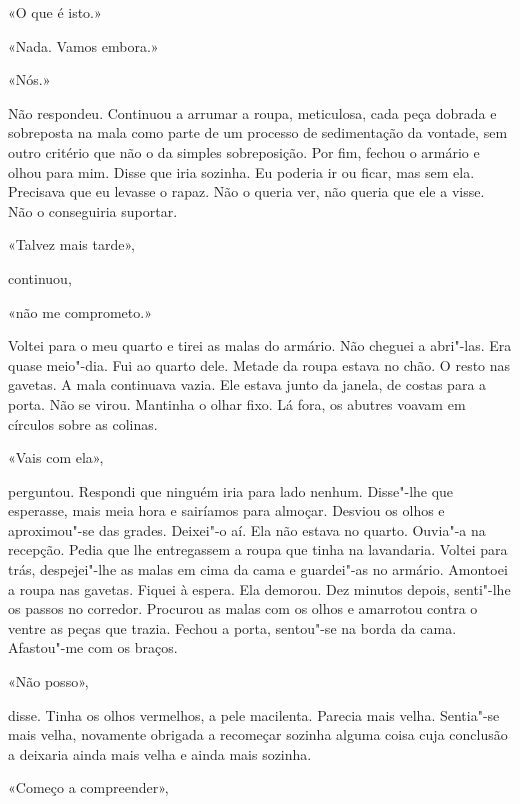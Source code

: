 «O que é isto.»

«Nada. Vamos embora.»

«Nós.»

Não respondeu. Continuou a arrumar a roupa, meticulosa, cada peça
dobrada e sobreposta na mala como parte de um processo de sedimentação
da vontade, sem outro critério que não o da simples sobreposição. Por
fim, fechou o armário e olhou para mim. Disse que iria sozinha. Eu
poderia ir ou ficar, mas sem ela. Precisava que eu levasse o rapaz. Não
o queria ver, não queria que ele a visse. Não o conseguiria suportar.

«Talvez mais tarde»,

continuou,

«não me comprometo.»

Voltei para o meu quarto e tirei as malas do armário. Não cheguei a
abri"-las. Era quase meio"-dia. Fui ao quarto dele. Metade da roupa
estava no chão. O resto nas gavetas. A mala continuava vazia. Ele estava
junto da janela, de costas para a porta. Não se virou. Mantinha o olhar
fixo. Lá fora, os abutres voavam em círculos sobre as colinas.

«Vais com ela»,

perguntou. Respondi que ninguém iria para lado nenhum. Disse"-lhe que
esperasse, mais meia hora e sairíamos para almoçar. Desviou os olhos e
aproximou"-se das grades. Deixei"-o aí. Ela não estava no quarto.
Ouvia"-a na recepção. Pedia que lhe entregassem a roupa que tinha na
lavandaria. Voltei para trás, despejei"-lhe as malas em cima da cama e
guardei"-as no armário. Amontoei a roupa nas gavetas. Fiquei à espera.
Ela demorou. Dez minutos depois, senti"-lhe os passos no corredor.
Procurou as malas com os olhos e amarrotou contra o ventre as peças que
trazia. Fechou a porta, sentou"-se na borda da cama. Afastou"-me com os
braços.

«Não posso»,

disse. Tinha os olhos vermelhos, a pele macilenta. Parecia mais velha.
Sentia"-se mais velha, novamente obrigada a recomeçar sozinha alguma
coisa cuja conclusão a deixaria ainda mais velha e ainda mais sozinha.

«Começo a compreender»,

